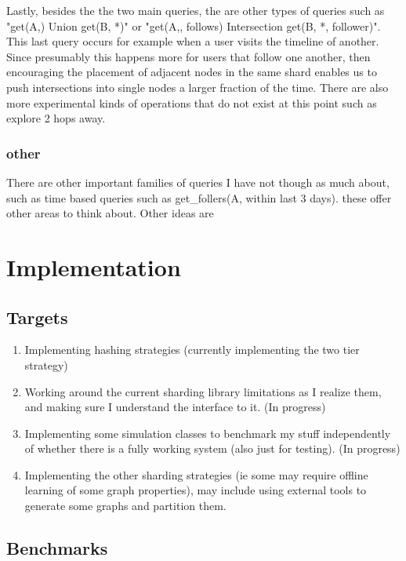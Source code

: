 \documentclass{article}
\begin{document}
Lastly, besides the the two main queries, the are other types of queries such as "get(A,) Union get(B, *)" or "get(A,, follows) Intersection get(B, *, follower)". This last query occurs for example when a user visits the timeline of another.  Since presumably this happens more for users that follow one another, then encouraging the placement of adjacent nodes in the same shard enables us to push intersections into single nodes a larger fraction of the time. There are also more experimental kinds of operations that do not exist at this point such as explore 2 hops away.

\subsubsection{other}

There are other important families of queries I have not though as much about, such as time based queries such as get\_follers(A, within last 3 days).  these offer other areas to think about. Other ideas are 

\section{Implementation}
\subsection{Targets}

\begin{enumerate}
\item Implementing hashing strategies (currently implementing the two tier strategy)
\item Working around the current sharding library limitations as I realize them, and making sure  I understand the interface to it. (In progress)
\item Implementing some simulation classes to benchmark my stuff  independently of whether there is a fully working system (also just for testing). (In progress)
\item Implementing the other sharding strategies (ie some may require offline learning of some graph properties), may include using external tools to generate some graphs and partition them.

\end{enumerate}

\subsection{Benchmarks}
\end{document}
